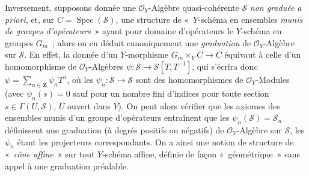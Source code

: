 Inversement, supposons donnée une $\mathcal{O}_Y$-Algèbre quasi-cohérente
$\mathcal{S}$ \emph{non graduée a priori}, et, sur
$C=\operatorname{Spec}(\mathcal{S})$, une structure de «~$Y$-schéma en
ensembles \emph{munis de groupes d'opérateurs}~» ayant pour domaine
d'opérateurs le $Y$-schéma en groupes $G_m$~; alors on en déduit
canoniquement une \emph{graduation} de $\mathcal{O}_Y$-Algèbre sur
$\mathcal{S}$. En effet, la donnée d'un $Y$-morphisme $G_m\times_YC\to C$
équivaut à celle d'un homomorphisme de $\mathcal{O}_Y$-Algèbres
$\psi:\mathcal{S}\to\mathcal{S}[T,T^{-1}]$, qui s'écrira donc
$\psi=\sum_{n\in\mathbf{Z}}\psi_nT^n$, où les
$\psi_n:\mathcal{S}\to\mathcal{S}$ sont des homomorphismes de
$\mathcal{O}_Y$-Modules (avec $\psi_n(s)=0$ sauf pour un nombre fini d'indices
pour toute section $s\in\Gamma(U,\mathcal{S})$, $U$ ouvert dans $Y$). On peut
alors vérifier que les axiomes des ensembles munis d'un groupe d'opérateurs
entraînent que les $\psi_n(\mathcal{S})=\mathcal{S}_n$ définissent une
graduation (à degrés positifs ou négatifs) de $\mathcal{O}_Y$-Algèbre sur
$\mathcal{S}$, les $\psi_n$ étant les projecteurs correspondants. On a ainsi
une notion de structure de «~\emph{cône affine}~» sur tout $Y$-schéma affine,
définie de façon «~géométrique~» sans appel à une graduation préalable.

